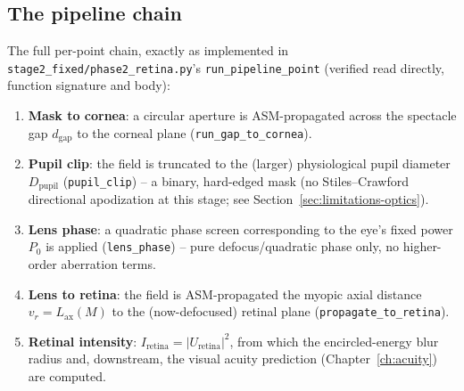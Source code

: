 \subsection{The pipeline chain}
The full per-point chain, exactly as implemented in
\texttt{stage2\_fixed/phase2\_retina.py}'s \texttt{run\_pipeline\_point} (verified read
directly, function signature and body):
\begin{enumerate}
  \item \textbf{Mask to cornea}: a circular aperture is ASM-propagated across the
  spectacle gap $d_{\mathrm{gap}}$ to the corneal plane (\texttt{run\_gap\_to\_cornea}).
  \item \textbf{Pupil clip}: the field is truncated to the (larger) physiological pupil
  diameter $D_{\mathrm{pupil}}$ (\texttt{pupil\_clip}) -- a binary, hard-edged mask
  (no Stiles--Crawford directional apodization at this stage; see
  Section~\ref{sec:limitations-optics}).
  \item \textbf{Lens phase}: a quadratic phase screen corresponding to the eye's fixed
  power $P_0$ is applied (\texttt{lens\_phase}) -- pure defocus/quadratic phase only, no
  higher-order aberration terms.
  \item \textbf{Lens to retina}: the field is ASM-propagated the myopic axial distance
  $v_r=L_{\mathrm{ax}}(M)$ to the (now-defocused) retinal plane
  (\texttt{propagate\_to\_retina}).
  \item \textbf{Retinal intensity}: $I_{\mathrm{retina}}=|U_{\mathrm{retina}}|^2$, from
  which the encircled-energy blur radius and, downstream, the visual acuity prediction
  (Chapter~\ref{ch:acuity}) are computed.
\end{enumerate}

